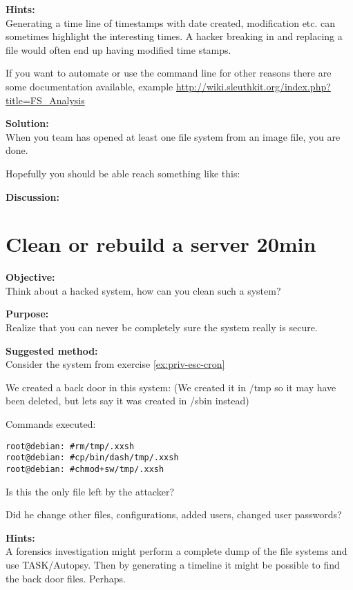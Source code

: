 \documentclass[a4paper,11pt,notitlepage]{report}
\begin{document}
{\bf Hints:}\\
Generating a time line of timestamps with date created, modification etc. can sometimes highlight the interesting times. A hacker breaking in and replacing a file would often end up having modified time stamps.

If you want to automate or use the command line for other reasons there are some documentation available, example \url{http://wiki.sleuthkit.org/index.php?title=FS_Analysis}

{\bf Solution:}\\
When you team has opened at least one file system from an image file, you are done.

Hopefully you should be able reach something like this:

{\bf Discussion:}\\



\chapter{Clean or rebuild a server 20min}
\label{ex:clean-or-rebuild}

{\bf Objective:}\\
Think about a hacked system, how can you clean such a system?

{\bf Purpose:}\\
Realize that you can never be completely sure the system really is secure.

{\bf Suggested method:}\\
Consider the system from exercise \ref{ex:priv-esc-cron}

We created a back door in this system:
(We created it in /tmp so it may have been deleted, but lets say it was created in /sbin instead)

Commands executed:

\begin{alltt}
root@debian:~# rm /tmp/.xxsh
root@debian:~# cp /bin/dash /tmp/.xxsh
root@debian:~# chmod +sw /tmp/.xxsh
\end{alltt}

Is this the only file left by the attacker?

Did he change other files, configurations, added users, changed user passwords?

{\bf Hints:}\\
A forensics investigation might perform a complete dump of the file systems and use TASK/Autopsy. Then by generating a timeline it might be possible to find the back door files. Perhaps.
\end{document}
